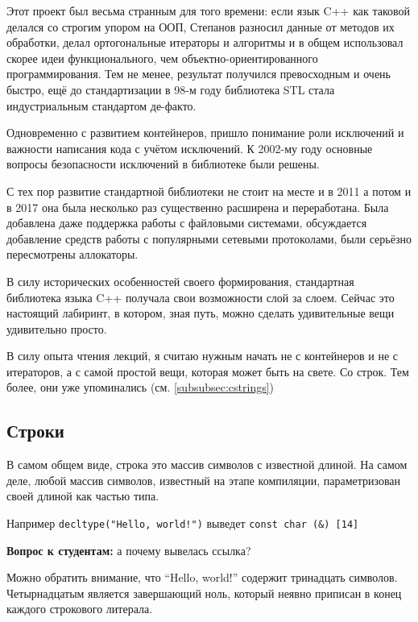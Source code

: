 \documentclass[a4paper,12pt,oneside]{article}
\newif\ifanswers
\begin{document}
Этот проект был весьма странным для того времени: если язык C++ как таковой делался со строгим упором на ООП, Степанов разносил данные от методов их обработки, делал ортогональные итераторы и алгоритмы и в общем использовал скорее идеи функционального, чем объектно-ориентированного программирования. Тем не менее, результат получился превосходным и очень быстро, ещё до стандартизации в 98-м году библиотека STL стала индустриальным стандартом де-факто.

Одновременно с развитием контейнеров, пришло понимание роли исключений и важности написания кода с учётом исключений. К 2002-му году основные вопросы безопасности исключений в библиотеке были решены.

С тех пор развитие стандартной библиотеки не стоит на месте и в 2011 а потом и в 2017 она была несколько раз существенно расширена и переработана. Была добавлена даже поддержка работы с файловыми системами, обсуждается добавление средств работы с популярными сетевыми протоколами, были серьёзно пересмотрены аллокаторы.

В силу исторических особенностей своего формирования, стандартная библиотека языка C++ получала свои возможности слой за слоем. Сейчас это настоящий лабиринт, в котором, зная путь, можно сделать удивительные вещи удивительно просто.

В силу опыта чтения лекций, я считаю нужным начать не с контейнеров и не с итераторов, а с самой простой вещи, которая может быть на свете. Со строк. Тем более, они уже упоминались (см. \ref{subsubsec:cstrings})

\pagebreak
\subsection{Строки}\label{subsec:strings}

В самом общем виде, строка это массив символов с известной длиной. На самом деле, любой массив символов, известный на этапе компиляции, параметризован своей длиной как частью типа.

Например \lstinline?decltype("Hello, world!")? выведет \lstinline!const char (&) [14]!

\textbf{Вопрос к студентам:} а почему вывелась ссылка?

\ifanswers
Правильный ответ: массив это всегда lvalue, а для lvalue вывод decltype приписывает левую ссылку
\fi

Можно обратить внимание, что ``Hello, world!'' содержит тринадцать символов. Четырнадцатым является завершающий ноль, который неявно приписан в конец каждого строкового литерала.
\end{document}
